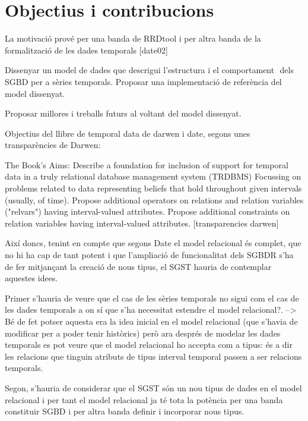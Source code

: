\section{Objectius i contribucions}



La motivació prové per una banda de RRDtool i per altra banda de la formalització de les dades temporals [date02]



  Dissenyar un model de dades que descrigui l'estructura i el comportament

  dels SGBD per a sèries temporals.
  Proposar una implementació de referència del model dissenyat.



  Proposar millores i treballs futurs al voltant del model dissenyat.



Objectius del llibre de temporal data de darwen i date, segons unes transparències de Darwen:

The Book’s Aims:
Describe a foundation for inclusion of support for temporal data in a truly
relational database management system (TRDBMS)
Focussing on problems related to data representing beliefs that hold throughout
given intervals (usually, of time).
Propose additional operators on relations and relation variables ("relvars")
having interval-valued attributes.
Propose additional constraints on relation variables having interval-valued
attributes.
[transparencies darwen]







Així doncs, tenint en compte que segons Date el model relacional és complet, que no hi ha cap de tant potent i que l'ampliació de funcionalitat dels SGBDR s'ha de fer mitjançant la creació de nous tipus, el SGST hauria de contemplar aquestes idees. 

Primer s'hauria de veure que el cas de les sèries temporals no sigui com el cas de les dades temporals a on sí que s'ha necessitat estendre el model relacional?. --> Bé de fet potser aquesta era la idea inicial en el model relacional (que s'havia de modificar per a poder tenir històrics) però ara després de modelar les dades temporals es pot veure que el model relacional ho accepta com a tipus: és a dir les relacions que tinguin atributs de tipus interval temporal passen a ser relacions temporals.

Segon, s'hauria de considerar que el SGST són un nou tipus de dades en el model relacional i per tant el model relacional ja té tota la potència per una banda constituir SGBD i per altra banda definir i incorporar nous tipus.


